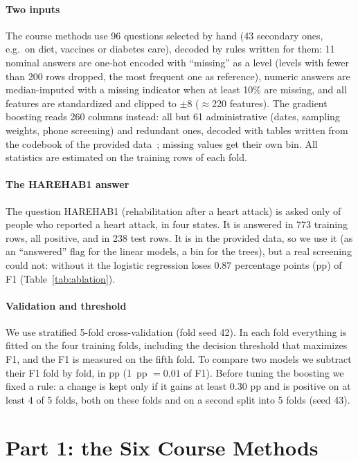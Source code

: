 \documentclass[10pt,conference,compsocconf]{IEEEtran}
\begin{document}
\paragraph{Two inputs}
The course methods use 96 questions selected by hand (43 secondary ones, e.g.\ on
diet, vaccines or diabetes care), decoded by rules written for them: 11 nominal
answers are one-hot encoded with ``missing'' as a level (levels with fewer than
200 rows dropped, the most frequent one as reference), numeric answers are
median-imputed with a missing indicator when at least 10\% are missing, and all
features are standardized and clipped to $\pm8$ ($\approx$220 features). The
gradient boosting reads 260 columns instead: all but 61 administrative (dates,
sampling weights, phone screening) and redundant ones, decoded with tables
written from the codebook of the provided data~\cite{brfss15}; missing values get their own bin. All statistics are
estimated on the training rows of each fold.

\paragraph{The HAREHAB1 answer}
The question HAREHAB1 (rehabilitation after a heart attack) is asked only of
people who reported a heart attack, in four states. It is answered in 773
training rows, all positive, and in 238 test rows. It is in the provided data,
so we use it (as an ``answered'' flag for the linear models, a bin for the
trees), but a real screening could not: without it the logistic regression loses
0.87 percentage points (pp) of F1 (Table~\ref{tab:ablation}).

\paragraph{Validation and threshold}
We use stratified 5-fold cross-validation (fold seed 42). In each fold everything
is fitted on the four training folds, including the decision threshold that
maximizes F1, and the F1 is measured on the fifth fold. To compare two models
we subtract their F1 fold by fold, in pp (1~pp $=0.01$ of F1). Before tuning
the boosting we fixed a rule: a change is kept only if it gains at least 0.30 pp and
is positive on at least 4 of 5 folds, both on these folds and on a second
split into 5 folds (seed 43).

\section{Part 1: the Six Course Methods}\label{sec:part1}
\end{document}
